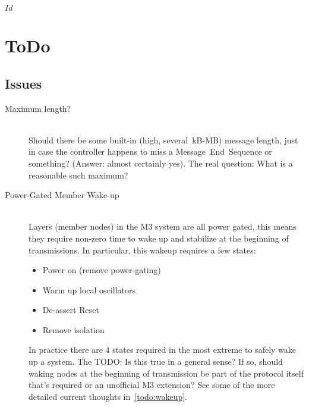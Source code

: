 \svnInfo $Id$

\section{ToDo}
\label{sec:todo}
\subsection{Issues}
\begin{description}
  \item[Maximum length?] \hfil \\
  Should there be some built-in (high, several~kB-MB) message length, just in
  case the controller happens to miss a Message~End~Sequence or something?
  (Answer: almost certainly yes). The real question: What is a reasonable such
  maximum?

  \item[Power-Gated Member Wake-up] \hfil \\
  Layers (member nodes) in the M3 system are all power gated, this means they
  require non-zero time to wake up and stabilize at the beginning of
  transmissions. In particular, this wakeup requires a few states:
  \begin{itemize}
    \item Power on (remove power-gating)
    \item Warm up local oscillators
    \item De-assert Reset
    \item Remove isolation
  \end{itemize}
  In practice there are 4 states required in the most extreme to safely wake
  up a system. The TODO: Is this true in a general sense? If so, should waking
  nodes at the beginning of transmission be part of the protocol itself that's
  required or an unofficial M3 extension? See some of the more detailed
  current thoughts in~\ref{todo:wakeup}.
\end{description}
